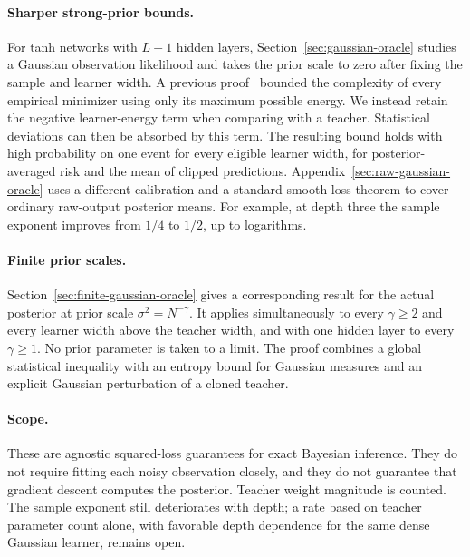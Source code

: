 \documentclass[11pt]{article}
\theoremstyle{definition}
\theoremstyle{remark}
\begin{document}
\paragraph{Sharper strong-prior bounds.}
For tanh networks with $L-1$ hidden layers, Section~\ref{sec:gaussian-oracle} studies a Gaussian observation likelihood and takes the prior scale to zero after fixing the sample and learner width. A previous proof~\cite{opus} bounded the complexity of every empirical minimizer using only its maximum possible energy. We instead retain the negative learner-energy term when comparing with a teacher. Statistical deviations can then be absorbed by this term. The resulting bound holds with high probability on one event for every eligible learner width, for posterior-averaged risk and the mean of clipped predictions. Appendix~\ref{sec:raw-gaussian-oracle} uses a different calibration and a standard smooth-loss theorem to cover ordinary raw-output posterior means. For example, at depth three the sample exponent improves from $1/4$ to $1/2$, up to logarithms.

\paragraph{Finite prior scales.}
Section~\ref{sec:finite-gaussian-oracle} gives a corresponding result for the actual posterior at prior scale $\sigma^2=N^{-\gamma}$. It applies simultaneously to every $\gamma\ge2$ and every learner width above the teacher width, and with one hidden layer to every $\gamma\ge1$. No prior parameter is taken to a limit. The proof combines a global statistical inequality with an entropy bound for Gaussian measures and an explicit Gaussian perturbation of a cloned teacher.

\paragraph{Scope.}
These are agnostic squared-loss guarantees for exact Bayesian inference. They do not require fitting each noisy observation closely, and they do not guarantee that gradient descent computes the posterior. Teacher weight magnitude is counted. The sample exponent still deteriorates with depth; a rate based on teacher parameter count alone, with favorable depth dependence for the same dense Gaussian learner, remains open.





\appendix

\end{document}
